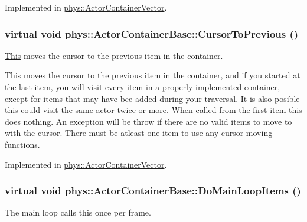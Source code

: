 Implemented in \hyperlink{classphys_1_1ActorContainerVector_a1c72366a6261d8e98dc0a9d2fad9f70f}{phys::ActorContainerVector}.

\hypertarget{classphys_1_1ActorContainerBase_a7c424168c0bbd973b283a083714123b3}{
\subsubsection[{CursorToPrevious}]{\setlength{\rightskip}{0pt plus 5cm}virtual void phys::ActorContainerBase::CursorToPrevious ()}}
\label{d1/d00/classphys_1_1ActorContainerBase_a7c424168c0bbd973b283a083714123b3}


\hyperlink{structThis}{This} moves the cursor to the previous item in the container. 

\hyperlink{structThis}{This} moves the cursor to the previous item in the container, and if you started at the last item, you will visit every item in a properly implemented container, except for items that may have bee added during your traversal. It is also posible this could visit the same actor twice or more. When called from the first item this does nothing. An exception will be throw if there are no valid items to move to with the cursor. There must be atleast one item to use any cursor moving functions. 

Implemented in \hyperlink{classphys_1_1ActorContainerVector_ac483bcdf348f55dc8b04a8805a002413}{phys::ActorContainerVector}.

\hypertarget{classphys_1_1ActorContainerBase_a67fbde6a61602253f66fecd0416bdc2f}{
\subsubsection[{DoMainLoopItems}]{\setlength{\rightskip}{0pt plus 5cm}virtual void phys::ActorContainerBase::DoMainLoopItems ()}}
\label{d1/d00/classphys_1_1ActorContainerBase_a67fbde6a61602253f66fecd0416bdc2f}


The main loop calls this once per frame. 

